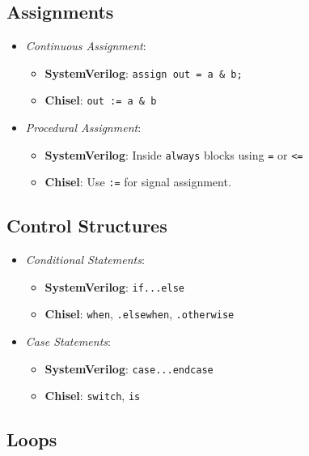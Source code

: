 \subsection{Assignments}

\begin{itemize}
    \item \textit{Continuous Assignment}:
        \begin{itemize}
            \item \textbf{SystemVerilog}: \texttt{assign out = a \& b;}
            \item \textbf{Chisel}: \texttt{out := a \& b}
        \end{itemize}
    \item \textit{Procedural Assignment}:
        \begin{itemize}
            \item \textbf{SystemVerilog}: Inside \texttt{always} blocks using \texttt{=} or \texttt{<=}
            \item \textbf{Chisel}: Use \texttt{:=} for signal assignment.
        \end{itemize}
\end{itemize}

\subsection{Control Structures}

\begin{itemize}
    \item \textit{Conditional Statements}:
        \begin{itemize}
            \item \textbf{SystemVerilog}: \texttt{if...else}
            \item \textbf{Chisel}: \texttt{when}, \texttt{.elsewhen}, \texttt{.otherwise}
        \end{itemize}
    \item \textit{Case Statements}:
        \begin{itemize}
            \item \textbf{SystemVerilog}: \texttt{case...endcase}
            \item \textbf{Chisel}: \texttt{switch}, \texttt{is}
        \end{itemize}
\end{itemize}

\subsection{Loops}

